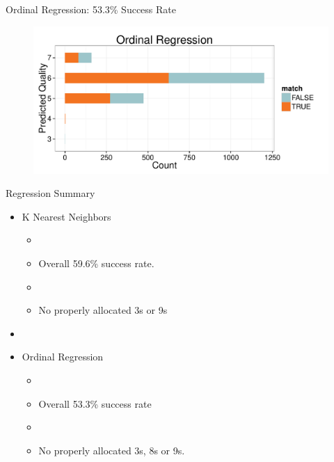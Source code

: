 \documentclass{beamer}
\begin{document}
\begin{frame}{Ordinal Regression: 53.3\% Success Rate}
	\begin{figure}
		\centering
		\includegraphics[width=\textwidth]{../images/OrdinalRegression_Results.pdf}
	\end{figure}

\end{frame}

\begin{frame}{Regression Summary}
	\begin{itemize}
	\item K Nearest Neighbors
	\begin{itemize}
		\item[]
		\item Overall 59.6\% success rate.
		\item[]
		\item No properly allocated 3s or 9s
	\end{itemize}
	\item[]
	\item Ordinal Regression
	\begin{itemize}
		\item[]	
		\item Overall 53.3\% success rate
		\item[]		
		\item No properly allocated 3s, 8s or 9s.
	\end{itemize}
	
	\end{itemize}

\end{frame}
\end{document}
